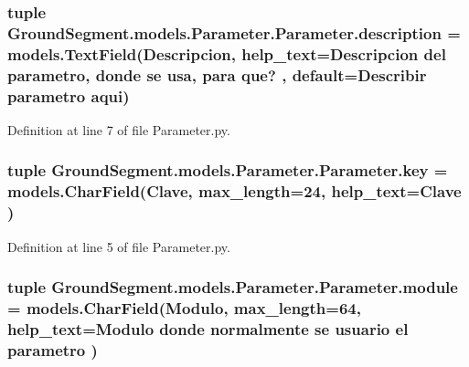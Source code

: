 \subsubsection[{description}]{\setlength{\rightskip}{0pt plus 5cm}tuple Ground\+Segment.\+models.\+Parameter.\+Parameter.\+description = models.\+Text\+Field(\textquotesingle{}Descripcion\textquotesingle{}, help\+\_\+text=\textquotesingle{}Descripcion del parametro, donde se usa, para que?\textquotesingle{} , default=\textquotesingle{}Describir parametro aqui\textquotesingle{})\hspace{0.3cm}{\ttfamily [static]}}\label{class_ground_segment_1_1models_1_1_parameter_1_1_parameter_a685979e7244995a427107dcd31ce55ff}


Definition at line 7 of file Parameter.\+py.

\hypertarget{class_ground_segment_1_1models_1_1_parameter_1_1_parameter_adb452d16d2b26aa423a928b243cf8a18}{}
\subsubsection[{key}]{\setlength{\rightskip}{0pt plus 5cm}tuple Ground\+Segment.\+models.\+Parameter.\+Parameter.\+key = models.\+Char\+Field(\textquotesingle{}Clave\textquotesingle{}, max\+\_\+length=24, help\+\_\+text=\textquotesingle{}Clave\textquotesingle{} )\hspace{0.3cm}{\ttfamily [static]}}\label{class_ground_segment_1_1models_1_1_parameter_1_1_parameter_adb452d16d2b26aa423a928b243cf8a18}


Definition at line 5 of file Parameter.\+py.

\hypertarget{class_ground_segment_1_1models_1_1_parameter_1_1_parameter_a880b8fa5882db5b609d5e31c71a12791}{}
\subsubsection[{module}]{\setlength{\rightskip}{0pt plus 5cm}tuple Ground\+Segment.\+models.\+Parameter.\+Parameter.\+module = models.\+Char\+Field(\textquotesingle{}Modulo\textquotesingle{}, max\+\_\+length=64, help\+\_\+text=\textquotesingle{}Modulo donde normalmente se usuario el parametro\textquotesingle{} )\hspace{0.3cm}{\ttfamily [static]}}\label{class_ground_segment_1_1models_1_1_parameter_1_1_parameter_a880b8fa5882db5b609d5e31c71a12791}


